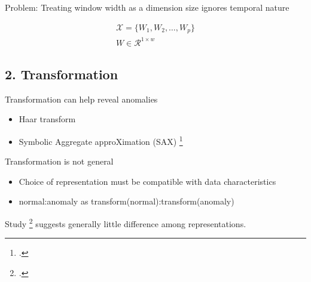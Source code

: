 \documentclass{beamer}
\begin{document}
  \begin{frame}{Problem: Treating window width as a dimension size ignores temporal nature}

    \begin{gather*}
      \mathcal{X} =\{W_1,W_2,\ldots,W_p\}   \\
      W \in \mathcal{R}^{1 \times w}
    \end{gather*}
    
  \end{frame}






  \subsection{2. Transformation}


  \begin{frame}{Transformation can help reveal anomalies}

    \begin{itemize}
    \item Haar transform %
    \item Symbolic Aggregate approXimation (SAX) \footcite{Lin2007}
    \end{itemize}

  \end{frame}

  \begin{frame}{Transformation is not general}

    \begin{itemize}
    \item Choice of representation must be compatible with data characteristics  %
    \item normal:anomaly as transform(normal):transform(anomaly)
    \end{itemize}

    Study \footcite{Wang2013} suggests generally little difference among representations.

  \end{frame}
\end{document}
